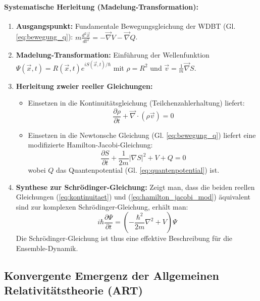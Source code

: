 \documentclass[11pt, a4paper]{article}
\begin{document}
\paragraph{Systematische Herleitung (Madelung-Transformation):}
\begin{enumerate}
    \item \textbf{Ausgangspunkt:} Fundamentale Bewegungsgleichung der WDBT (Gl. \ref{eq:bewegung_q}): $m \frac{d^2 \vec{x}}{dt^2} = -\vec{\nabla} V - \vec{\nabla} Q$.
    \item \textbf{Madelung-Transformation:} Einführung der Wellenfunktion $\Psi(\vec{x}, t) = R(\vec{x}, t) e^{i S(\vec{x}, t)/\hbar}$ mit $\rho = R^2$ und $\vec{v} = \frac{1}{m} \vec{\nabla} S$.
    \item \textbf{Herleitung zweier reeller Gleichungen:}
    \begin{itemize}
        \item Einsetzen in die Kontinuitätsgleichung (Teilchenzahlerhaltung) liefert:
        \begin{equation}
        \label{eq:kontinuitaet}
        \frac{\partial \rho}{\partial t} + \vec{\nabla} \cdot (\rho \vec{v}) = 0
        \end{equation}
        \item Einsetzen in die Newtonsche Gleichung (Gl. \ref{eq:bewegung_q}) liefert eine modifizierte Hamilton-Jacobi-Gleichung:
        \begin{equation}
        \label{eq:hamilton_jacobi_mod}
        \frac{\partial S}{\partial t} + \frac{1}{2m} |\nabla S|^2 + V + Q = 0
        \end{equation}
        wobei $Q$ das Quantenpotential (Gl. \ref{eq:quantenpotential}) ist.
    \end{itemize}
    \item \textbf{Synthese zur Schrödinger-Gleichung:} Zeigt man, dass die beiden reellen Gleichungen (\ref{eq:kontinuitaet}) und (\ref{eq:hamilton_jacobi_mod}) äquivalent sind zur komplexen Schrödinger-Gleichung, erhält man:
    \begin{equation}
    \label{eq:schroedinger}
    i\hbar \frac{\partial \Psi}{\partial t} = \left( -\frac{\hbar^2}{2m} \nabla^2 + V \right) \Psi
    \end{equation}
    Die Schrödinger-Gleichung ist thus eine effektive Beschreibung für die Ensemble-Dynamik.
\end{enumerate}

\subsection{Konvergente Emergenz der Allgemeinen Relativitätstheorie (ART)}
\label{subsec:emergenz_art}
\end{document}
